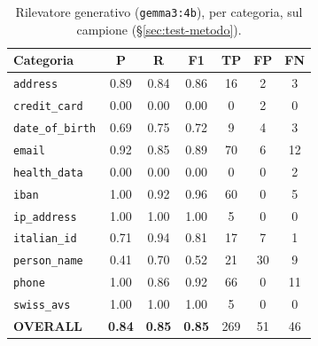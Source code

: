 \begin{table}
	\centering
	\caption{Rilevatore generativo (\texttt{gemma3:4b}), per categoria, sul campione (§\ref{sec:test-metodo}).}
	\label{tab:test-ai}
	\small
	\begin{tabular}{|l|c|c|c|c|c|c|}
		\hline
		\textbf{Categoria}       & \textbf{P}    & \textbf{R}    & \textbf{F1}   & \textbf{TP} & \textbf{FP} & \textbf{FN} \\
		\hline
		\texttt{address}         & 0.89          & 0.84          & 0.86          & 16          & 2           & 3           \\
		\hline
		\texttt{credit\_card}    & 0.00          & 0.00          & 0.00          & 0           & 2           & 0           \\
		\hline
		\texttt{date\_of\_birth} & 0.69          & 0.75          & 0.72          & 9           & 4           & 3           \\
		\hline
		\texttt{email}           & 0.92          & 0.85          & 0.89          & 70          & 6           & 12          \\
		\hline
		\texttt{health\_data}    & 0.00          & 0.00          & 0.00          & 0           & 0           & 2           \\
		\hline
		\texttt{iban}            & 1.00          & 0.92          & 0.96          & 60          & 0           & 5           \\
		\hline
		\texttt{ip\_address}     & 1.00          & 1.00          & 1.00          & 5           & 0           & 0           \\
		\hline
		\texttt{italian\_id}     & 0.71          & 0.94          & 0.81          & 17          & 7           & 1           \\
		\hline
		\texttt{person\_name}    & 0.41          & 0.70          & 0.52          & 21          & 30          & 9           \\
		\hline
		\texttt{phone}           & 1.00          & 0.86          & 0.92          & 66          & 0           & 11          \\
		\hline
		\texttt{swiss\_avs}      & 1.00          & 1.00          & 1.00          & 5           & 0           & 0           \\
		\hline
		\textbf{OVERALL}         & \textbf{0.84} & \textbf{0.85} & \textbf{0.85} & 269         & 51          & 46          \\
		\hline
	\end{tabular}
\end{table}

